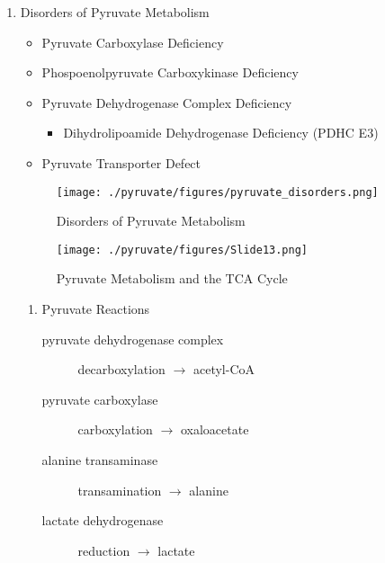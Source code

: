 \documentclass{scrartcl}
\begin{document}
\begin{enumerate}
\item Disorders of Pyruvate Metabolism
\label{sec:orgc66ca9a}
\begin{itemize}
\item Pyruvate Carboxylase Deficiency
\item Phospoenolpyruvate Carboxykinase Deficiency
\item Pyruvate Dehydrogenase Complex Deficiency
\begin{itemize}
\item Dihydrolipoamide Dehydrogenase Deficiency (PDHC E3)
\end{itemize}
\item Pyruvate Transporter Defect
\end{itemize}

\begin{figure}[htbp]
\centering
\texttt{[image: ./pyruvate/figures/pyruvate\_disorders.png]}
\caption[TCA]{\label{fig:org7f1be13}
Disorders of Pyruvate Metabolism}
\end{figure}


\begin{figure}[htbp]
\centering
\texttt{[image: ./pyruvate/figures/Slide13.png]}
\caption[TCA]{\label{fig:org99633ce}
Pyruvate Metabolism and the TCA Cycle}
\end{figure}

\begin{enumerate}
\item Pyruvate Reactions
\label{sec:org974318b}

\begin{description}
\item[{pyruvate dehydrogenase complex}] decarboxylation \(\to\) acetyl-CoA
\end{description}


\begin{description}
\item[{pyruvate carboxylase}] carboxylation \(\to\) oxaloacetate
\end{description}


\begin{description}
\item[{alanine transaminase}] transamination \(\to\) alanine
\end{description}


\begin{description}
\item[{lactate dehydrogenase}] reduction \(\to\) lactate
\end{description}

\end{enumerate}
\end{enumerate}
\end{document}
